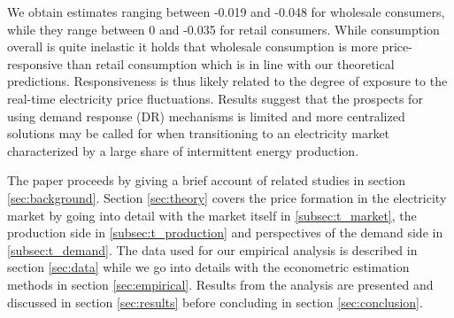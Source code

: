 \par
We obtain estimates ranging between -0.019 and -0.048 for wholesale consumers, while they range between 0 and -0.035 for retail consumers.  While consumption overall is quite inelastic it holds that wholesale consumption is more price-responsive than retail consumption which is in line with our theoretical predictions. Responsiveness is thus likely related to the degree of exposure to the real-time electricity price fluctuations. Results suggest that the prospects for using demand response (DR) mechanisms is limited and more centralized solutions may be called for when transitioning to an electricity market characterized by a large share of intermittent energy production. %
\bigskip \par
The paper proceeds by giving a brief account of related studies in section \ref{sec:background}. Section \ref{sec:theory} covers the price formation in the electricity market by going into detail with the market itself in \ref{subsec:t_market}, the production side in \ref{subsec:t_production} and perspectives of the demand side in \ref{subsec:t_demand}. The data used for our empirical analysis is described in section \ref{sec:data} while we go into details with the econometric estimation methods in section \ref{sec:empirical}. Results from the analysis are presented and discussed in section \ref{sec:results} before concluding in section \ref{sec:conclusion}.
